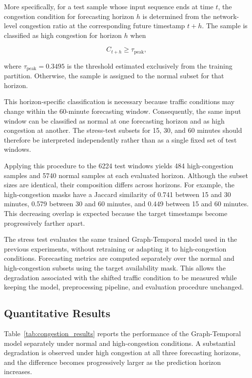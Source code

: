 More specifically, for a test sample whose input sequence ends at time $t$,
the congestion condition for forecasting horizon $h$ is determined from the
network-level congestion ratio at the corresponding future timestamp
$t+h$. The sample is classified as high congestion for horizon $h$ when

\begin{equation}
    C_{t+h} \geq \tau_{\mathrm{peak}},
    \label{eq:high_congestion_sample}
\end{equation}

where $\tau_{\mathrm{peak}}=0.3495$ is the threshold estimated exclusively
from the training partition. Otherwise, the sample is assigned to the normal
subset for that horizon.

This horizon-specific classification is necessary because traffic conditions
may change within the 60-minute forecasting window. Consequently, the same
input window can be classified as normal at one forecasting horizon and as
high congestion at another. The stress-test subsets for 15, 30, and
60 minutes should therefore be interpreted independently rather than as a
single fixed set of test windows.

Applying this procedure to the 6224 test windows yields 484 high-congestion
samples and 5740 normal samples at each evaluated horizon. Although the
subset sizes are identical, their composition differs across horizons. For
example, the high-congestion masks have a Jaccard similarity of 0.741 between
15 and 30 minutes, 0.579 between 30 and 60 minutes, and 0.449 between
15 and 60 minutes. This decreasing overlap is expected because the target
timestamps become progressively farther apart.

The stress test evaluates the same trained Graph-Temporal model used in the
previous experiments, without retraining or adapting it to high-congestion
conditions. Forecasting metrics are computed separately over the normal and
high-congestion subsets using the target availability mask. This allows the
degradation associated with the shifted traffic condition to be measured
while keeping the model, preprocessing pipeline, and evaluation procedure
unchanged.

\subsection{Quantitative Results}
\label{subsec:shift_quantitative}

Table~\ref{tab:congestion_results} reports the performance of the
Graph-Temporal model separately under normal and high-congestion conditions.
A substantial degradation is observed under high congestion at all three
forecasting horizons, and the difference becomes progressively larger as the
prediction horizon increases.

